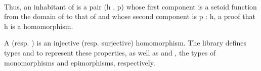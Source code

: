\begin{code}%
\>[0]\<%
\\
\>[0][@{}l@{\AgdaIndent{1}}]%
\>[1]\AgdaSpace{}%
\AgdaSpace{}%
\AgdaSymbol{(}\AgdaSpace{}%
\AgdaSymbol{:}\AgdaSpace{}%
\AgdaOperator{\AgdaFunction{𝔻[}}\AgdaSpace{}%
\AgdaSpace{}%
\AgdaOperator{\AgdaFunction{]}}\AgdaSpace{}%
\AgdaSpace{}%
\AgdaOperator{\AgdaFunction{𝔻[}}\AgdaSpace{}%
\AgdaSpace{}%
\AgdaOperator{\AgdaFunction{]}}\AgdaSymbol{)}\AgdaSpace{}%
\AgdaSymbol{:}\AgdaSpace{}%
\AgdaSpace{}%
\AgdaSymbol{(}\AgdaSpace{}%
\AgdaSpace{}%
\AgdaSpace{}%
\AgdaSpace{}%
\AgdaSpace{}%
\AgdaSpace{}%
\AgdaSymbol{)}\AgdaSpace{}%
\<%
\\
\>[1][@{}l@{\AgdaIndent{0}}]%
\>[2]\AgdaSpace{}%
\AgdaSpace{}%
\AgdaSymbol{;}\AgdaSpace{}%
\AgdaSpace{}%
\AgdaSpace{}%
\AgdaSymbol{:}\AgdaSpace{}%
\AgdaSpace{}%
\<%
\\
%
\\[\AgdaEmptyExtraSkip]%
%
\>[1]\AgdaSpace{}%
\AgdaSymbol{:}\AgdaSpace{}%
\AgdaSpace{}%
\AgdaSymbol{\AgdaUnderscore{}}\<%
\\
%
\>[1]\AgdaSpace{}%
\AgdaSymbol{=}\AgdaSpace{}%
\AgdaSpace{}%
\AgdaSymbol{(}\AgdaOperator{\AgdaFunction{𝔻[}}\AgdaSpace{}%
\AgdaSpace{}%
\AgdaOperator{\AgdaFunction{]}}\AgdaSpace{}%
\AgdaSpace{}%
\AgdaOperator{\AgdaFunction{𝔻[}}\AgdaSpace{}%
\AgdaSpace{}%
\AgdaOperator{\AgdaFunction{]}}\AgdaSymbol{)}\AgdaSpace{}%
\<%
\\
\>[0]\<%
\end{code}
Thus, an inhabitant of  is a pair (\ab h , \ab p) whose first component is
a setoid function from the domain of  to that of  and whose second component
is \ab p :  \ab h, a proof that \ab h is a homomorphism.

A  (resp. ) is an injective (resp. surjective)
homomorphism.  The \agdaalgebras library defines types  and  to
represent these properties, as well as  and , the types of monomorphisms
and epimorphisms, respectively.
\ifshort %
\else    %


